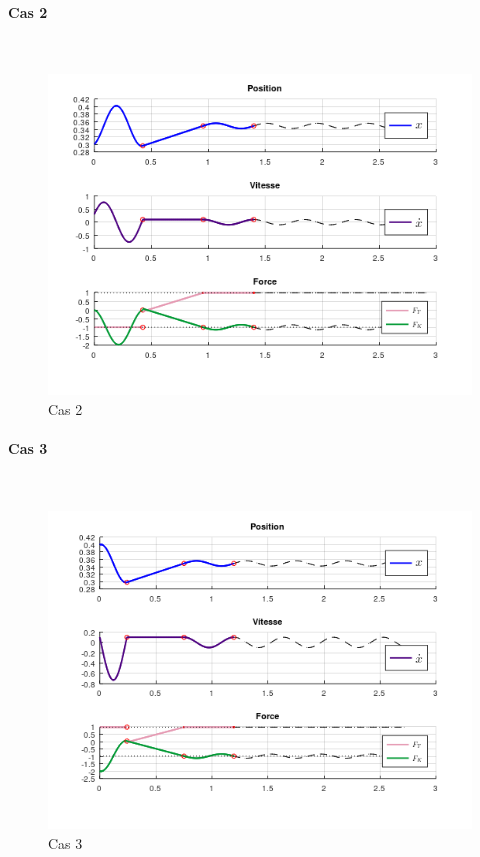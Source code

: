 \documentclass{article}
\begin{document}
\paragraph{Cas 2}
$ $ 
\begin{figure}[h!]
	\centering
	\includegraphics[scale=.6]{CAS2.png}
	\caption{Cas 2}
\end{figure}

\paragraph{Cas 3}
$ $ 
\begin{figure}[h!]
	\centering
	\includegraphics[scale=.75]{CAS3.png}
	\caption{Cas 3}
\end{figure}
\end{document}
